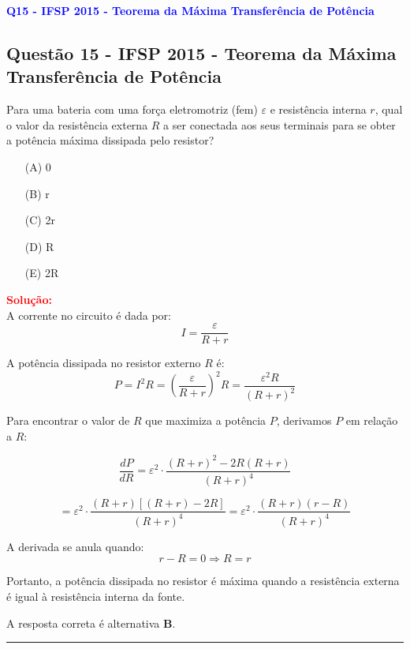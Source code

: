 \documentclass[a4paper,12pt]{article}
\begin{document}
\begin{flushleft}
\textbf{\textcolor{blue}{\Large Q15 - IFSP 2015 - Teorema da Máxima Transferência de Potência}}\\
\noindent

\subsection{Quest\~ao 15 - IFSP 2015 - Teorema da Máxima Transferência de Potência}
Para uma bateria com uma força eletromotriz (fem) \( \varepsilon \) e resistência 
interna \( r \), qual o valor da resistência externa \( R \) a ser conectada aos 
seus terminais para se obter a potência máxima dissipada pelo resistor?

\begin{itemize}
\item[(A)] 0
\item[(B)] r
\item[(C)] 2r
\item[(D)] R
\item[(E)] 2R
\end{itemize}

\vspace{0.5cm}

\textcolor{red}{\textbf{Solução:}}\\

A corrente no circuito é dada por:
\[
I = \frac{\varepsilon}{R + r}
\]

A potência dissipada no resistor externo \( R \) é:
\[
P = I^2 R = \left( \frac{\varepsilon}{R + r} \right)^2 R = \frac{\varepsilon^2 R}{(R + r)^2}
\]

Para encontrar o valor de \( R \) que maximiza a potência \( P \), derivamos \( P \) em relação a \( R \):

\[
\frac{dP}{dR} = \varepsilon^2 \cdot \frac{(R + r)^2 - 2R(R + r)}{(R + r)^4}
\]

\[
= \varepsilon^2 \cdot \frac{(R + r)[(R + r) - 2R]}{(R + r)^4}
= \varepsilon^2 \cdot \frac{(R + r)(r - R)}{(R + r)^4}
\]

A derivada se anula quando:
\[
r - R = 0 \Rightarrow R = r
\]

Portanto, a potência dissipada no resistor é máxima 
quando a resistência externa é igual à resistência interna da fonte.


A resposta correta é alternativa \colorbox{green!50}{\textbf{B}}.
\end{flushleft}

\noindent\rule{\linewidth}{0.6pt}\\
\end{document}
